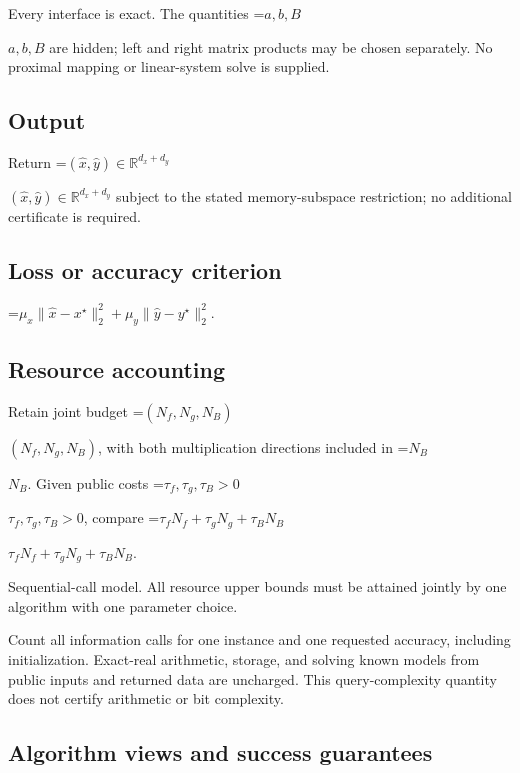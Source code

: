 \documentclass[10pt,a4paper]{article}
\newcommand{\AtlasMath}[1]{\par\begingroup\centering\setbox0=\hbox{$\displaystyle #1$}\ifdim\wd0>1.4\linewidth\typeout{ATLAS WIDE FORMULA: \the\wd0}\fi\ifdim\wd0>\linewidth\resizebox{\linewidth}{!}{\box0}\else\box0\fi\par\endgroup}
\newcommand{\AtlasInlineMath}[1]{\begingroup\setbox0=\hbox{$#1$}\ifdim\wd0>.4\linewidth\endgroup\AtlasMath{#1}\else\endgroup$#1$\fi}
\begin{document}
Every interface is exact. The quantities \AtlasInlineMath{a,b,B} are hidden; left and right matrix products may be chosen separately. No proximal mapping or linear-system solve is supplied.



\subsection{Output}


Return \AtlasInlineMath{(\widehat{x},\widehat{y})\in\mathbb{R}^{d_x+d_y}} subject to the stated memory-subspace restriction; no additional certificate is required.



\subsection{Loss or accuracy criterion}



\AtlasMath{\mu_x\|\widehat{x}-x^\star\|_2^2+\mu_y\|\widehat{y}-y^\star\|_2^2.}




\subsection{Resource accounting}


Retain joint budget \AtlasInlineMath{(N_f,N_g,N_B)}, with both multiplication directions included in \AtlasInlineMath{N_B}. Given public costs \AtlasInlineMath{\tau_f,\tau_g,\tau_B>0}, compare \AtlasInlineMath{\tau_fN_f+\tau_gN_g+\tau_BN_B}.



Sequential-call model. All resource upper bounds must be attained jointly by one algorithm with one parameter choice.



Count all information calls for one instance and one requested accuracy, including initialization. Exact-real arithmetic, storage, and solving known models from public inputs and returned data are uncharged. This query-complexity quantity does not certify arithmetic or bit complexity.



\subsection{Algorithm views and success guarantees}
\end{document}
